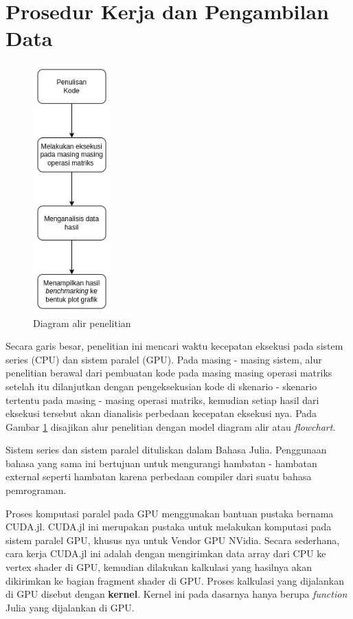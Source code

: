 \section{Prosedur Kerja dan Pengambilan Data}

\begin{figure}[h]
	\centering
	\includegraphics[width=3cm, scale=1]{schema/metode.drawio.png}
	\caption{Diagram alir penelitian}
	\label{img:methods}
\end{figure}

Secara garis besar, penelitian ini mencari waktu kecepatan eksekusi pada sistem
series (CPU) dan sistem paralel (GPU). Pada masing - masing sistem, alur
penelitian berawal dari pembuatan kode pada masing masing operasi matriks
setelah itu dilanjutkan dengan pengeksekusian kode di skenario - skenario
tertentu pada masing - masing operasi matriks, kemudian setiap hasil dari
eksekusi tersebut akan dianalisis perbedaan kecepatan eksekusi nya. Pada Gambar
\ref{img:methods} disajikan alur penelitian dengan model diagram alir atau
\emph{flowchart}.

Sistem series dan sistem paralel dituliskan dalam Bahasa Julia. Penggunaan
bahasa yang sama ini bertujuan untuk mengurangi hambatan - hambatan external
seperti hambatan karena perbedaan compiler dari suatu bahasa pemrograman.

Proses komputasi paralel pada GPU menggunakan bantuan pustaka bernama
CUDA.jl. CUDA.jl ini merupakan pustaka untuk melakukan komputasi pada
sistem paralel GPU, khusus nya untuk Vendor GPU NVidia. Secara sederhana, cara
kerja CUDA.jl ini adalah dengan mengirimkan data array dari CPU ke vertex
shader di GPU, kemudian dilakukan kalkulasi yang hasilnya akan dikirimkan ke
bagian fragment shader di GPU. Proses kalkulasi yang dijalankan di GPU disebut
dengan \textbf{kernel}. Kernel ini pada dasarnya hanya berupa \emph{function}
Julia yang dijalankan di GPU.

